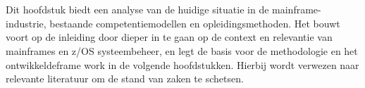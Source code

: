 \chapter{}%
\label{ch:stand-van-zaken}





Dit hoofdstuk biedt een analyse van de huidige situatie in de mainframe-industrie, bestaande competentiemodellen en opleidingsmethoden. Het bouwt voort op de
inleiding door dieper in te gaan op de context en relevantie van mainframes en
z/OS systeembeheer, en legt de basis voor de methodologie en het ontwikkeldeframe
work in de volgende hoofdstukken. Hierbij wordt verwezen naar relevante literatuur om de stand van zaken te schetsen.

\section{}
\label{sec:wat-zijn-mainframes}

